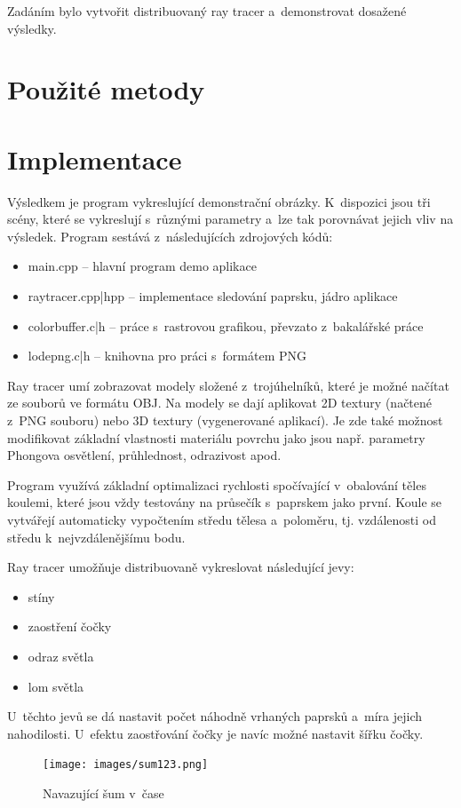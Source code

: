 \documentclass[12pt,a4paper,titlepage,final]{report}
\begin{document}
Zadáním bylo vytvořit distribuovaný ray tracer a~demonstrovat dosažené
výsledky.

\chapter{Použité metody}


\chapter{Implementace}

Výsledkem je program vykreslující demonstrační obrázky. K~dispozici jsou
tři scény, které se vykreslují s~různými parametry a~lze tak porovnávat
jejich vliv na výsledek. Program sestává z~následujících zdrojových kódů:

\begin{itemize}
    \item main.cpp -- hlavní program demo aplikace
    \item raytracer.{cpp|hpp} -- implementace sledování paprsku, jádro aplikace
    \item colorbuffer.{c|h} -- práce s~rastrovou grafikou, převzato z~bakalářské práce
    \item lodepng.{c|h} -- knihovna pro práci s~formátem PNG
\end{itemize}

Ray tracer umí zobrazovat modely složené z~trojúhelníků, které je možné
načítat ze souborů ve formátu OBJ. Na modely se dají aplikovat 2D
textury (načtené z~PNG souboru) nebo 3D textury (vygenerované aplikací).
Je zde také možnost modifikovat základní vlastnosti materiálu povrchu
jako jsou např. parametry Phongova osvětlení, průhlednost, odrazivost
apod.

Program využívá základní optimalizaci rychlosti spočívající v~obalování
těles koulemi, které jsou vždy testovány na průsečík s~paprskem jako
první. Koule se vytvářejí automaticky vypočtením středu tělesa
a~poloměru, tj. vzdálenosti od středu k~nejvzdálenějšímu bodu.

Ray tracer umožňuje distribuovaně vykreslovat následující jevy:

\begin{itemize}
    \item stíny
    \item zaostření čočky
    \item odraz světla
    \item lom světla
\end{itemize}

U~těchto jevů se dá nastavit počet náhodně vrhaných paprsků a~míra
jejich nahodilosti. U~efektu zaostřování čočky je navíc možné nastavit
šířku čočky.

\begin{figure}[h] \centering
        \texttt{[image: images/sum123.png]}
    \caption{Navazující šum v~čase} \label{fig:noise_cont_time}
\end{figure}
\end{document}
